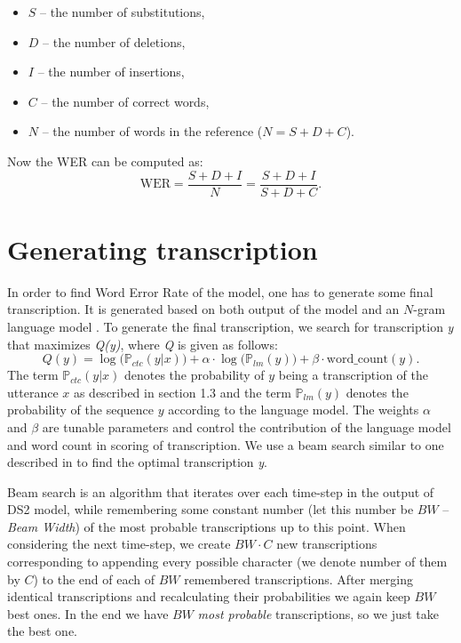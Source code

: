 \documentclass[licencjacka,en]{pracamgr}
\begin{document}
	\begin{itemize}
		\item $S$ -- the number of substitutions,
		\item $D$ -- the number of deletions,
		\item $I$ -- the number of insertions,
		\item $C$ -- the number of correct words,
		\item $N$ -- the number of words in the reference ($N=S+D+C$).
	\end{itemize}
	Now the WER can be computed as:
	$$
	\text{WER} = \frac{S + D + I}{N} = \frac{S + D + I}{S + D + C}.
	$$
	
	\section{Generating transcription} \label{sec:transcription}
	In order to find Word Error Rate of the model, one has to generate some final transcription. It is generated based on both output of the model and an $N$-gram language model \cite{DS9}. To generate the final transcription, we search for transcription \textit{y} that maximizes \textit{Q(y)}, where \textit{Q} is given as follows:
	$$
	Q(y) = \log \big(\mathbb{P}_{ctc}(y|x)\big) + \alpha \cdot \log \big( \mathbb{P}_{lm}(y) \big) + \beta \cdot \text{word\_count}(y).
	$$
	The term $\mathbb{P}_{ctc}(y|x)$ denotes the probability of $y$ being a transcription of the utterance $x$ as described in section 1.3 and the term $\mathbb{P}_{lm}(y)$ denotes the probability of the sequence $y$ according to the language model. The weights $\alpha$ and $\beta$ are tunable parameters and control the contribution of the language model and word count in scoring of transcription. We use a beam search similar to one described in \cite{DS7} to find the optimal transcription \textit{y}.
	
	Beam search is an algorithm that iterates over each time-step in the output of DS2 model, while remembering some constant number (let this number be $BW$ -- \textit{Beam Width}) of the most probable transcriptions up to this point. When considering the next time-step, we create $BW \cdot C$ new transcriptions corresponding to appending every possible character (we denote number of them by $C$) to the end of each of $BW$ remembered transcriptions. After merging identical transcriptions and recalculating their probabilities we again keep $BW$ best ones. In the end we have $BW$ \textit{most probable} transcriptions, so we just take the best one.
	
\end{document}
